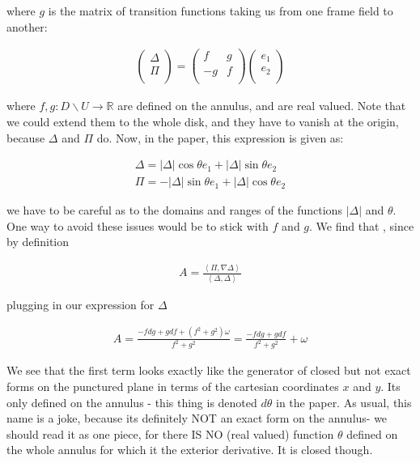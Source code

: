 \documentclass[11pt,onecolumn, a4page]{article}
\numberwithin{equation}{subsection}
\begin{document}
where $g$ is the matrix of transition functions taking us from one frame field to another:


\begin{eqnarray}
\begin{pmatrix} 
 \Delta\\
  \Pi \\
 \end{pmatrix} 
 =
 \begin{pmatrix} 
 f & g\\
  -g & f \\
 \end{pmatrix}
 \begin{pmatrix} 
 e_{1}\\
  e_{2} \\
 \end{pmatrix} 
\end{eqnarray}

where $f,g : D\backslash U \rightarrow \mathbb{R}$ are defined on the annulus, and are real valued. Note that we could extend them to the whole disk, and they have to vanish at the origin, because $\Delta$ and $\Pi$ do. Now, in the paper, this expression is given as:

\begin{eqnarray}
\Delta = |\Delta| \cos\theta e_{1} + |\Delta| \sin\theta e_{2} \\
\Pi = -|\Delta| \sin\theta e_{1} + |\Delta| \cos\theta e_{2}
\end{eqnarray} 

we have to be careful as to the domains and ranges of the functions $|\Delta|$ and $\theta$. One way to avoid these issues would be to stick with $f$ and $g$. We find that , since by definition

\begin{eqnarray}
A = \frac{\left<\Pi, \nabla \Delta \right>}{\left<\Delta, \Delta \right>}
\end{eqnarray}

plugging in our expression for $\Delta$

\begin{eqnarray}
A = \frac{-fdg+gdf +(f^{2}+g{^2})\omega}{f^{2}+g^{2}} = \frac{-fdg+gdf}{f^{2}+g^{2}} + \omega
\end{eqnarray}

We see that the first term looks exactly like the generator of closed but not exact forms on the punctured plane in terms of the cartesian coordinates $x$ and $y$. Its only defined on the annulus - this thing is denoted $d\theta$ in the paper. As usual, this name is a joke, because its definitely NOT an exact form on the annulus- we should read it as one piece, for there IS NO (real valued) function $\theta$ defined on the whole annulus for which it the exterior derivative. It is closed though.
\end{document}

